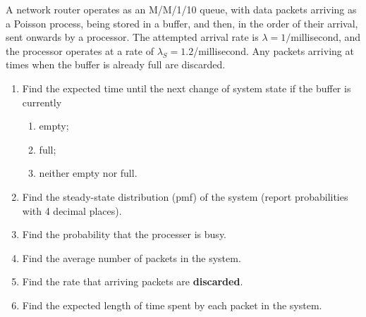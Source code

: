   \item A network router operates as an M/M/1/10 queue, with data packets arriving as
    a Poisson process, being stored in a buffer, and then, in the order of their arrival, sent onwards
    by a processor. The attempted arrival rate is $\lambda= 1/$millisecond, and the processor operates at a rate of $\lambda_S = 1.2$/millisecond. Any packets arriving at times when the buffer is already full are discarded.
    \begin{enumerate}
      \item Find the expected time until the next change of system state if the buffer is currently
        \begin{enumerate}
          \item empty;
          \item full;
          \item neither empty nor full.
        \end{enumerate}
      \item Find the steady-state distribution (pmf) of the system
        (report probabilities with 4 decimal places).
      \item Find the probability that the processer is busy.
      \item Find the average number of packets in the system.
      \item Find the rate that arriving packets are {\bf discarded}. 
      \item Find the expected length of time spent by each packet in the system.
    \end{enumerate}
